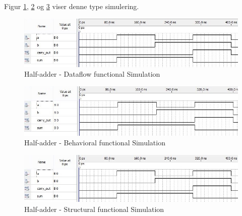 \begin{enumerate}
	Figur \ref{fig:HaDataflowFunctionalSim}, \ref{fig:HaBehavioralFunctionalSim} og \ref{fig:HaStructuralFunctionalSim} viser denne type simulering.\\
\begin{figure}[h]
	\includegraphics[scale=0.6]{pictures/Oevelse1/Half_adder/Dataflow_functional_simulation.jpg}
	\caption{Half-adder - Dataflow functional Simulation}
	\label{fig:HaDataflowFunctionalSim}
\end{figure}
\begin{figure}[h]
	\includegraphics[scale=0.6]{pictures/Oevelse1/Half_adder/Behavioral_functional_simulation.jpg}
	\caption{Half-adder - Behavioral functional Simulation}
	\label{fig:HaBehavioralFunctionalSim}
\end{figure}
\begin{figure}[h]
	\includegraphics[scale=0.6]{pictures/Oevelse1/Half_adder/Structural_functional_simulation.jpg}
	\caption{Half-adder - Structural functional Simulation}
	\label{fig:HaStructuralFunctionalSim}
\end{figure}
	\newpage
\end{enumerate}

